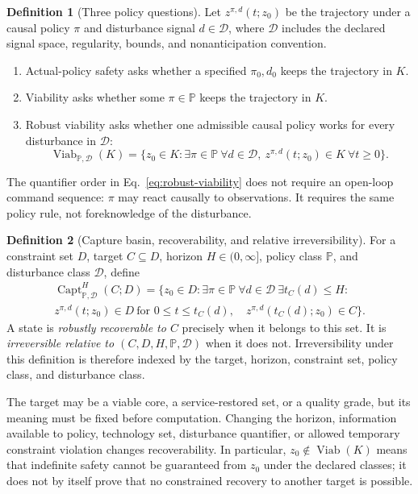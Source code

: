 \documentclass[11pt]{article}
\theoremstyle{definition}
\newtheorem{definition}{Definition}
\newcommand{\Viab}{\operatorname{Viab}}
\begin{document}
\begin{definition}[Three policy questions]
Let $z^{\pi,d}(t;z_0)$ be the trajectory under a causal policy $\pi$ and disturbance signal $d\in\mathcal D$, where $\mathcal D$ includes the declared signal space, regularity, bounds, and nonanticipation convention.

\begin{enumerate}
\item Actual-policy safety asks whether a specified $\pi_0,d_0$ keeps the trajectory in $K$.
\item Viability asks whether some $\pi\in\mathbb P$ keeps the trajectory in $K$.
\item Robust viability asks whether one admissible causal policy works for every disturbance in $\mathcal D$:
\begin{equation}
\Viab_{\mathbb P,\mathcal D}(K)
=\{z_0\in K:\exists\pi\in\mathbb P\ \forall d\in\mathcal D,
\ z^{\pi,d}(t;z_0)\in K\ \forall t\ge0\}.
\label{eq:robust-viability}
\end{equation}
\end{enumerate}
\end{definition}

The quantifier order in Eq.~\eqref{eq:robust-viability} does not require an open-loop command sequence: $\pi$ may react causally to observations. It requires the same policy rule, not foreknowledge of the disturbance.

\begin{definition}[Capture basin, recoverability, and relative irreversibility]
For a constraint set $D$, target $C\subseteq D$, horizon $H\in(0,\infty]$, policy class $\mathbb P$, and disturbance class $\mathcal D$, define
\begin{multline}
\operatorname{Capt}^{H}_{\mathbb P,\mathcal D}(C;D)
=\{z_0\in D:\exists\pi\in\mathbb P\ \forall d\in\mathcal D\ 
\exists t_C(d)\le H:\\
 z^{\pi,d}(t;z_0)\in D\ \text{for }0\le t\le t_C(d),
\quad z^{\pi,d}(t_C(d);z_0)\in C\}.
\label{eq:capture-basin}
\end{multline}
A state is \emph{robustly recoverable to $C$} precisely when it belongs to this set. It is \emph{irreversible relative to $(C,D,H,\mathbb P,\mathcal D)$} when it does not. Irreversibility under this definition is therefore indexed by the target, horizon, constraint set, policy class, and disturbance class.
\end{definition}

The target may be a viable core, a service-restored set, or a quality grade, but its meaning must be fixed before computation. Changing the horizon, information available to policy, technology set, disturbance quantifier, or allowed temporary constraint violation changes recoverability. In particular, $z_0\notin\Viab(K)$ means that indefinite safety cannot be guaranteed from $z_0$ under the declared classes; it does not by itself prove that no constrained recovery to another target is possible.
\end{document}
